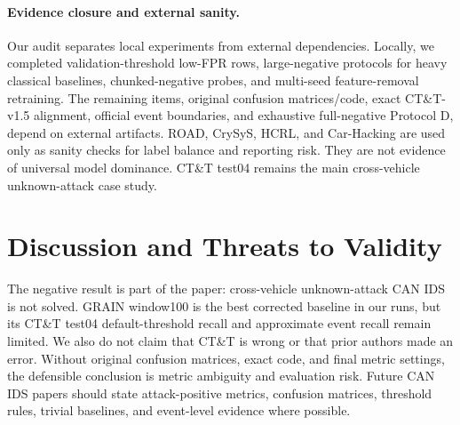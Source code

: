 \documentclass[runningheads]{llncs}
\begin{document}
\begin{table}[!htbp]
\caption{Low-FPR and approximate event evidence on CT\&T test04.  Validation rows use thresholds selected on the train-derived validation split; best-test rows are upper-bound score-separability diagnostics.}
\label{tab:lowfpr}
\centering
{}
\end{table}

\paragraph{Evidence closure and external sanity.}
Our audit separates local experiments from external dependencies.  Locally, we completed validation-threshold low-FPR rows, large-negative protocols for heavy classical baselines, chunked-negative probes, and multi-seed feature-removal retraining.  The remaining items, original confusion matrices/code, exact CT\&T-v1.5 alignment, official event boundaries, and exhaustive full-negative Protocol D, depend on external artifacts.  ROAD, CrySyS, HCRL, and Car-Hacking are used only as sanity checks for label balance and reporting risk.  They are not evidence of universal model dominance.  CT\&T test04 remains the main cross-vehicle unknown-attack case study.

\section{Discussion and Threats to Validity}
The negative result is part of the paper: cross-vehicle unknown-attack CAN IDS is not solved.  GRAIN window100 is the best corrected baseline in our runs, but its CT\&T test04 default-threshold recall and approximate event recall remain limited.  We also do not claim that CT\&T is wrong or that prior authors made an error.  Without original confusion matrices, exact code, and final metric settings, the defensible conclusion is metric ambiguity and evaluation risk.  Future CAN IDS papers should state attack-positive metrics, confusion matrices, threshold rules, trivial baselines, and event-level evidence where possible.
\end{document}

